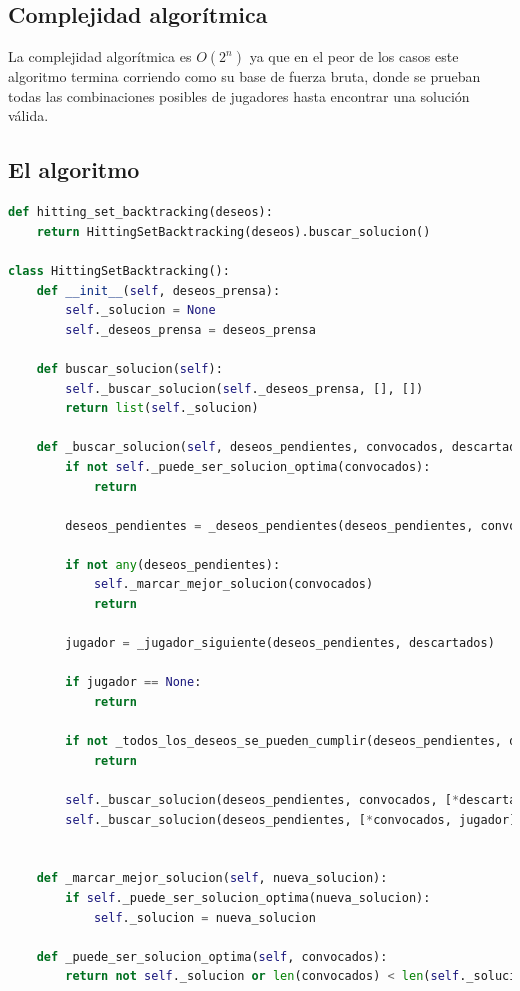 \documentclass{estilo}
\begin{document}
\subsection{Complejidad algorítmica}

La complejidad algorítmica es $O(2^n)$ ya que en el peor de los casos este algoritmo termina corriendo como su base de fuerza bruta, donde se prueban todas las combinaciones posibles de jugadores hasta encontrar una solución válida.

\newpage
\subsection{El algoritmo}
\begin{lstlisting}[language=Python]
def hitting_set_backtracking(deseos):
    return HittingSetBacktracking(deseos).buscar_solucion()

class HittingSetBacktracking():
    def __init__(self, deseos_prensa):
        self._solucion = None
        self._deseos_prensa = deseos_prensa
    
    def buscar_solucion(self):
        self._buscar_solucion(self._deseos_prensa, [], [])
        return list(self._solucion)

    def _buscar_solucion(self, deseos_pendientes, convocados, descartados):
        if not self._puede_ser_solucion_optima(convocados):
            return
            
        deseos_pendientes = _deseos_pendientes(deseos_pendientes, convocados)
        
        if not any(deseos_pendientes):
            self._marcar_mejor_solucion(convocados)
            return
    
        jugador = _jugador_siguiente(deseos_pendientes, descartados)
    
        if jugador == None:
            return
    
        if not _todos_los_deseos_se_pueden_cumplir(deseos_pendientes, descartados):
            return
                
        self._buscar_solucion(deseos_pendientes, convocados, [*descartados, jugador])
        self._buscar_solucion(deseos_pendientes, [*convocados, jugador], descartados)


    def _marcar_mejor_solucion(self, nueva_solucion):
        if self._puede_ser_solucion_optima(nueva_solucion):
            self._solucion = nueva_solucion
        
    def _puede_ser_solucion_optima(self, convocados):
        return not self._solucion or len(convocados) < len(self._solucion)


\end{lstlisting}
\end{document}
